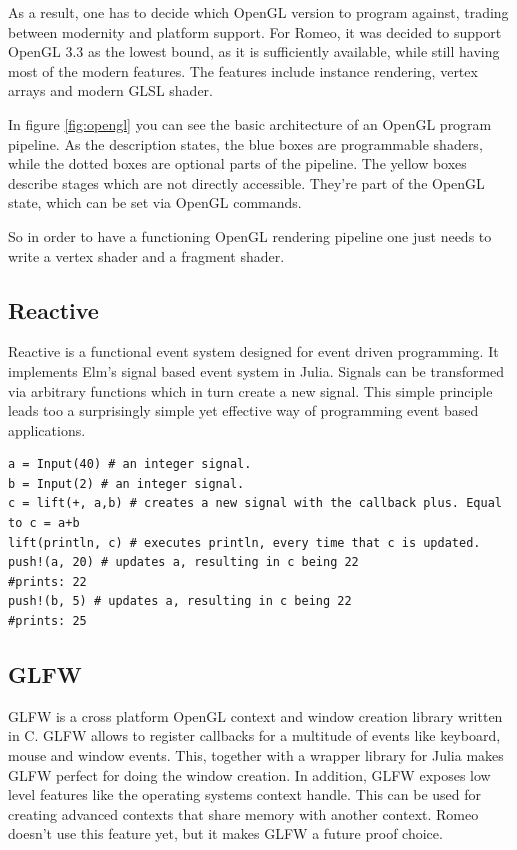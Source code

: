 As a result, one has to decide which \ac{OpenGL} version to program against, trading between modernity and platform support.
For Romeo, it was decided to support \ac{OpenGL} 3.3 as the lowest bound, as it is sufficiently available, while still having most of the modern features.
The features include instance rendering, vertex arrays and modern \ac{GLSL} shader.

In figure \ref{fig:opengl} you can see the basic architecture of an OpenGL program pipeline.
As the description states, the blue boxes are programmable shaders, while the dotted boxes are optional parts of the pipeline.
The yellow boxes describe stages which are not directly accessible. They're part of the OpenGL state, which can be set via OpenGL commands.

So in order to have a functioning OpenGL rendering pipeline one just needs to write a vertex shader and a fragment shader.

\subsection{Reactive}
Reactive is a functional event system designed for event driven programming.
It implements Elm's signal based event system in Julia.
Signals can be transformed via arbitrary functions which in turn create a new signal.
This simple principle leads too a surprisingly simple yet effective way of programming event based applications.

\begin{lstlisting}
a = Input(40) # an integer signal.
b = Input(2) # an integer signal.
c = lift(+, a,b) # creates a new signal with the callback plus. Equal to c = a+b
lift(println, c) # executes println, every time that c is updated. 
push!(a, 20) # updates a, resulting in c being 22
#prints: 22
push!(b, 5) # updates a, resulting in c being 22
#prints: 25
\end{lstlisting}

\subsection{GLFW}
GLFW is a cross platform \ac{OpenGL} context and window creation library written in C.
GLFW allows to register callbacks for a multitude of events like keyboard, mouse and window events.
This, together with a wrapper library for Julia makes GLFW perfect for doing the window creation.
In addition, GLFW exposes low level features like the operating systems context handle.
This can be used for creating advanced contexts that share memory with another context.
Romeo doesn't use this feature yet, but it makes GLFW a future proof choice.


